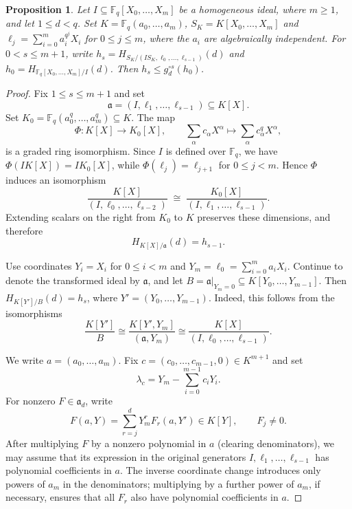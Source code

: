 \documentclass[11pt]{amsart}
\newtheorem{proposition}[theorem]{Proposition}
\theoremstyle{definition}
\newcommand{\F}{\mathbb F}
\numberwithin{equation}{section}
\begin{document}
\begin{proposition}\label{prop:frobenius}
Let $I\subseteq\F_q[X_0,\ldots,X_m]$ be a homogeneous ideal,
where $m\ge1$, and let $1\le d<q$. Set $K=\F_q(a_0,\ldots,a_m)$, $S_K=K[X_0,\ldots,X_m]$ and $\ell_j=\sum_{i=0}^m a_i^{q^j}X_i$ for $0\le j\le m$, where the $a_i$ are algebraically independent. For $0< s\le m+1$, write $h_s=H_{S_K/(IS_K,\ell_0,\ldots,\ell_{s-1})}(d)$ and $h_0=H_{\F_q[X_0,\ldots,X_m]/I}(d)$. Then $h_s\le g_d^{\circ s}(h_0)$.
\end{proposition}

\begin{proof}
Fix $1\le s\le m+1$ and set
\[
\mathfrak a=(I,\ell_1,\ldots,\ell_{s-1})\subseteq K[X].
\]
Set $K_0=\F_q(a_0^q,\ldots,a_m^q)\subseteq K$. The map
\[
 \Phi:K[X]\longrightarrow K_0[X],
 \qquad
 \sum_{\alpha}c_{\alpha}X^{\alpha}
 \longmapsto
 \sum_{\alpha}c_{\alpha}^qX^{\alpha},
\]
is a graded ring isomorphism. Since $I$ is defined over $\F_q$,
we have $\Phi(IK[X])=IK_0[X]$, while
$\Phi(\ell_j)=\ell_{j+1}$ for $0\le j<m$. Hence $\Phi$ induces an isomorphism
\[
 \frac{K[X]}{(I,\ell_0,\ldots,\ell_{s-2})}
 \;\cong\;
 \frac{K_0[X]}{(I,\ell_1,\ldots,\ell_{s-1})}.
\]
Extending scalars on the right
from $K_0$ to $K$ preserves these dimensions, and therefore
\[
 H_{K[X]/\mathfrak a}(d)=h_{s-1}.
\]

Use coordinates $Y_i=X_i$ for $0\le i<m$ and
$Y_m=\ell_0=\sum_{i=0}^m a_iX_i$. Continue to denote the transformed
ideal by $\mathfrak a$, and let
\(
B=\mathfrak a\big|_{Y_m=0}\subseteq K[Y_0,\ldots,Y_{m-1}].
\)
Then $H_{K[Y']/B}(d)=h_s$, where $Y'=(Y_0,\ldots,Y_{m-1})$. Indeed, this follows from the isomorphisms
\[
\frac{K[Y']}{B}
\cong
\frac{K[Y',Y_m]}{(\mathfrak a,Y_m)}
\cong
\frac{K[X]}{(I,\ell_0,\ldots,\ell_{s-1})}.
\]

We write $a=(a_0,\dots,a_m)$. Fix
$c=(c_0,\ldots,c_{m-1},0)\in K^{m+1}$ and set
\[
\lambda_c=Y_m-\sum_{i=0}^{m-1}c_iY_i.
\]
For nonzero $F\in\mathfrak a_d$, write
\begin{equation}\label{eq:exp_F_b_Y}
F(a,Y)=\sum_{r=j}^dY_m^rF_r(a,Y')\in K[Y],\qquad F_j\ne0.
\end{equation}
After multiplying $F$ by a nonzero polynomial in $a$ (clearing denominators), we may assume
that its expression in the original generators $I,\ell_1,\ldots,\ell_{s-1}$
has polynomial coefficients in $a$. The inverse coordinate change
introduces only powers of $a_m$ in the denominators; multiplying
by a further power of $a_m$, if necessary, ensures that all $F_r$
also have polynomial coefficients in $a$.




\end{proof}
\end{document}
